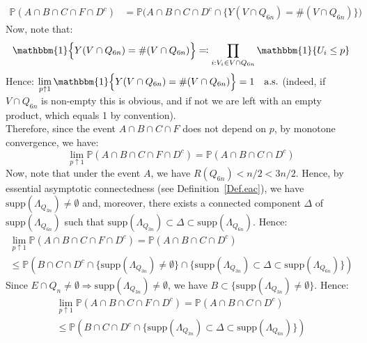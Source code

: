 \documentclass[10pt,a4paper]{amsart}
\theoremstyle{exampstyle}
\theoremstyle{exampnotations}
\begin{document}
\begin{align*}
    \mathbb{P}(A \cap B \cap C \cap F \cap D^c) &= \mathbb{P}\Big(A \cap B \cap C \cap D^c \cap \lbrace Y(V \cap Q_{6n}) = \#(V \cap Q_{6n}) \rbrace \Big)
\end{align*}
Now, note that:
\begin{equation*}
    \mathbbm{1}\Big\lbrace Y(V \cap Q_{6n}) = \#(V \cap Q_{6n}) \Big\rbrace \eqqcolon \prod_{i : V_i \in V \cap Q_{6n}} \mathbbm{1} \lbrace U_i \leq p \rbrace
\end{equation*}
Hence: $\displaystyle \lim_{p \uparrow 1} \mathbbm{1}\Big\lbrace Y(V \cap Q_{6n}) = \#(V \cap Q_{6n}) \Big\rbrace = 1 \quad \text{a.s.}$ (indeed, if $V\cap Q_{6n}$ is non-empty this is obvious, and if not we are left with an empty product, which equals 1 by convention). \\
Therefore, since the event $A \cap B \cap C \cap F$ does not depend on $p$, by monotone convergence, we have:
\begin{equation*}
\lim_{p \uparrow 1} \mathbb{P}(A \cap B \cap C \cap F \cap D^{c}) = \mathbb{P}(A \cap B \cap C \cap D^c) 
\end{equation*}
Now, note that under the event $A$, we have $R(Q_{6n}) < n/2 < 3n/2$. Hence, by essential asymptotic connectedness (see Definition~\ref{Def.eac}), we have $\text{supp}(\Lambda_{Q_{3n}}) \neq \emptyset$ and, moreover, there exists a connected component $\Delta$ of $\text{supp}(\Lambda_{Q_{6n}})$ such that $\text{supp}(\Lambda_{Q_{3n}}) \subset \Delta \subset \text{supp}(\Lambda_{Q_{6n}})$. Hence:
\begin{gather*}
    \lim_{p \uparrow 1} \mathbb{P}(A \cap B \cap C \cap F \cap D^{c})  = \mathbb{P}(A \cap B \cap C \cap D^c)  \\ \leq \mathbb{P}\left(B \cap C \cap D^c \cap \Big\lbrace \text{supp}(\Lambda_{Q_{3n}}) \neq \emptyset \Big\rbrace \cap \Big\lbrace \text{supp}(\Lambda_{Q_{3n}}) \subset \Delta \subset \text{supp}(\Lambda_{Q_{6n}}) \Big\rbrace \right)
\end{gather*}
Since $E \cap Q_n \neq \emptyset \Rightarrow \text{supp}(\Lambda_{Q_{3n}}) \neq \emptyset$, we have $B \subset \Big\lbrace \text{supp}(\Lambda_{Q_{3n}}) \neq \emptyset \Big\rbrace$. Hence:
\begin{gather*}
    \lim_{p \uparrow 1} \mathbb{P}(A \cap B \cap C \cap F \cap D^{c})  = \mathbb{P}(A \cap B \cap C \cap D^c)  \\ \leq \mathbb{P}\left(B \cap C \cap D^c  \cap \Big\lbrace \text{supp}(\Lambda_{Q_{3n}}) \subset \Delta \subset \text{supp}(\Lambda_{Q_{6n}}) \Big\rbrace \right)
\end{gather*}
\end{document}
